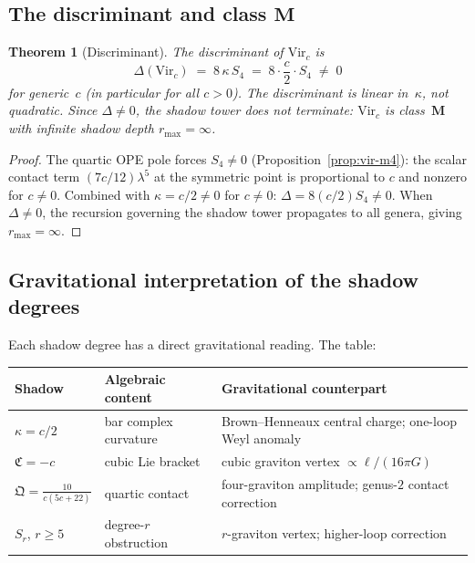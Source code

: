 \documentclass[11pt,reqno]{amsart}
\newtheorem{theorem}{Theorem}[section]
\theoremstyle{definition}
\theoremstyle{remark}
\begin{document}
\subsection{The discriminant and class $\mathbf{M}$}

\begin{theorem}[Discriminant]
\label{thm:discriminant}
The discriminant of\/ $\mathrm{Vir}_c$ is
\begin{equation}\label{eq:discriminant}
\Delta(\mathrm{Vir}_c) \;=\; 8\,\kappa\,S_4
\;=\; 8 \cdot \frac{c}{2} \cdot S_4 \;\ne\; 0
\end{equation}
for generic~$c$ (in particular for all\/ $c > 0$). The discriminant
is linear in~$\kappa$, not quadratic. Since\/ $\Delta \ne 0$, the
shadow tower does not terminate: $\mathrm{Vir}_c$ is
class~$\mathbf{M}$ with infinite shadow depth\/ $r_{\max} = \infty$.
\end{theorem}

\begin{proof}
The quartic OPE pole forces $S_4 \ne 0$
(Proposition~\ref{prop:vir-m4}): the scalar contact term
$(7c/12)\lambda^5$ at the symmetric point is proportional to $c$ and
nonzero for $c \ne 0$. Combined with $\kappa = c/2 \ne 0$ for
$c \ne 0$: $\Delta = 8(c/2)S_4 \ne 0$. When $\Delta \ne 0$, the
recursion governing the shadow tower propagates to all genera, giving
$r_{\max} = \infty$.
\end{proof}

\subsection{Gravitational interpretation of the shadow degrees}

Each shadow degree has a direct gravitational reading. The table:

\medskip
\begin{center}
\small
\renewcommand{\arraystretch}{1.3}
\begin{tabular}{@{}lll@{}}
\textbf{Shadow} & \textbf{Algebraic content}
  & \textbf{Gravitational counterpart} \\
\hline
$\kappa = c/2$
  & bar complex curvature
  & Brown--Henneaux central charge; one-loop Weyl anomaly \\[2pt]
$\mathfrak{C} = -c$
  & cubic Lie bracket
  & cubic graviton vertex $\propto \ell/(16\pi G)$ \\[2pt]
$\mathfrak{Q} = \frac{10}{c(5c+22)}$
  & quartic contact
  & four-graviton amplitude; genus-$2$ contact correction \\[2pt]
$S_r$, $r \ge 5$
  & degree-$r$ obstruction
  & $r$-graviton vertex; higher-loop correction
\end{tabular}
\end{center}
\end{document}
